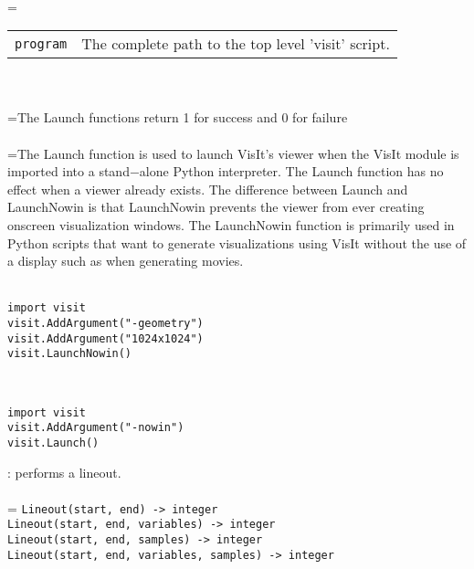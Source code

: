 \documentclass[10pt,a4paper]{report}
\begin{document}
 \\ 
\hangindent=\parindent 
\begin{tabular}{lp{9cm}}
\verb!program! & The complete path to the top level 'visit' script. \\
\end{tabular} \\[-2mm]


 \\ 
\hangindent=\parindent The Launch functions return 1 for success and 0 for failure \\[-3mm] 

 \\ 
\hangindent=\parindent The Launch function is used to launch VisIt's viewer when the VisIt module is imported into a stand$-$alone Python interpreter. The Launch function has no effect when a viewer already exists. The difference between Launch and LaunchNowin is that LaunchNowin prevents the viewer from ever creating onscreen visualization windows. The LaunchNowin function is primarily used in Python scripts that want to generate visualizations using VisIt without the use of a display such as when generating movies. \\[-3mm] 

\\[-6mm]
\begin{verbatim}import visit
visit.AddArgument("-geometry")
visit.AddArgument("1024x1024")
visit.LaunchNowin()
\end{verbatim}
\\[-6mm]
\begin{verbatim}import visit
visit.AddArgument("-nowin")
visit.Launch()
\end{verbatim}
\newpage


{}
: performs a lineout.\\[-3mm]

 \\ 
\hangindent=\parindent 
\verb!Lineout(start, end) -> integer!\\ 
\verb!Lineout(start, end, variables) -> integer!\\ 
\verb!Lineout(start, end, samples) -> integer!\\ 
\verb!Lineout(start, end, variables, samples) -> integer!\\ [-3mm]
\end{document}
